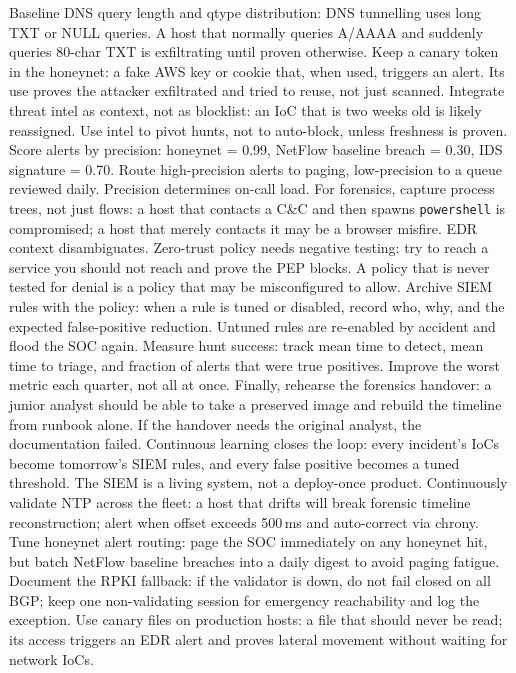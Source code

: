 Baseline DNS query length and qtype distribution: DNS tunnelling uses long TXT or NULL queries. A host that normally queries A/AAAA and suddenly queries 80-char TXT is exfiltrating until proven otherwise.
Keep a canary token in the honeynet: a fake AWS key or cookie that, when used, triggers an alert. Its use proves the attacker exfiltrated and tried to reuse, not just scanned.
Integrate threat intel as context, not as blocklist: an IoC that is two weeks old is likely reassigned. Use intel to pivot hunts, not to auto-block, unless freshness is proven.
Score alerts by precision: honeynet = 0.99, NetFlow baseline breach = 0.30, IDS signature = 0.70. Route high-precision alerts to paging, low-precision to a queue reviewed daily. Precision determines on-call load.
For forensics, capture process trees, not just flows: a host that contacts a C\&C and then spawns \texttt{powershell} is compromised; a host that merely contacts it may be a browser misfire. EDR context disambiguates.
Zero-trust policy needs negative testing: try to reach a service you should not reach and prove the PEP blocks. A policy that is never tested for denial is a policy that may be misconfigured to allow.
Archive SIEM rules with the policy: when a rule is tuned or disabled, record who, why, and the expected false-positive reduction. Untuned rules are re-enabled by accident and flood the SOC again.
Measure hunt success: track mean time to detect, mean time to triage, and fraction of alerts that were true positives. Improve the worst metric each quarter, not all at once.
Finally, rehearse the forensics handover: a junior analyst should be able to take a preserved image and rebuild the timeline from runbook alone. If the handover needs the original analyst, the documentation failed.
Continuous learning closes the loop: every incident's IoCs become tomorrow's SIEM rules, and every false positive becomes a tuned threshold. The SIEM is a living system, not a deploy-once product.
Continuously validate NTP across the fleet: a host that drifts will break forensic timeline reconstruction; alert when offset exceeds 500\,ms and auto-correct via chrony.
Tune honeynet alert routing: page the SOC immediately on any honeynet hit, but batch NetFlow baseline breaches into a daily digest to avoid paging fatigue.
Document the RPKI fallback: if the validator is down, do not fail closed on all BGP; keep one non-validating session for emergency reachability and log the exception.
Use canary files on production hosts: a file that should never be read; its access triggers an EDR alert and proves lateral movement without waiting for network IoCs.

